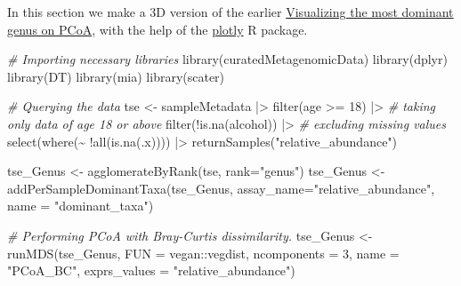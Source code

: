 \documentclass[
]{book}
\newenvironment{Shaded}{\begin{snugshade}}{\end{snugshade}}
\newcommand{\AttributeTok}[1]{\textcolor[rgb]{0.77,0.63,0.00}{#1}}
\newcommand{\CommentTok}[1]{\textcolor[rgb]{0.56,0.35,0.01}{\textit{#1}}}
\newcommand{\DecValTok}[1]{\textcolor[rgb]{0.00,0.00,0.81}{#1}}
\newcommand{\FunctionTok}[1]{\textcolor[rgb]{0.00,0.00,0.00}{#1}}
\newcommand{\NormalTok}[1]{#1}
\newcommand{\OtherTok}[1]{\textcolor[rgb]{0.56,0.35,0.01}{#1}}
\newcommand{\SpecialCharTok}[1]{\textcolor[rgb]{0.00,0.00,0.00}{#1}}
\newcommand{\StringTok}[1]{\textcolor[rgb]{0.31,0.60,0.02}{#1}}
\begin{document}
\begin{Shaded}
\end{Shaded}

In this section we make a 3D version of the earlier \href{https://microbiome.github.io/OMA/microbiome-exploration.html\#visualizing-the-most-dominant-genus-on-pcoa}{Visualizing the most dominant genus on PCoA}, with the help of the \href{https://plotly.com/r/}{plotly} R package.

\begin{Shaded}
\begin{Highlighting}[]
\CommentTok{\# Importing necessary libraries}
\FunctionTok{library}\NormalTok{(curatedMetagenomicData)}
\FunctionTok{library}\NormalTok{(dplyr)}
\FunctionTok{library}\NormalTok{(DT)}
\FunctionTok{library}\NormalTok{(mia)}
\FunctionTok{library}\NormalTok{(scater)}

\CommentTok{\# Querying the data}
\NormalTok{tse }\OtherTok{\textless{}{-}}\NormalTok{ sampleMetadata }\SpecialCharTok{|\textgreater{}}
    \FunctionTok{filter}\NormalTok{(age }\SpecialCharTok{\textgreater{}=} \DecValTok{18}\NormalTok{) }\SpecialCharTok{|\textgreater{}} \CommentTok{\# taking only data of age 18 or above}
    \FunctionTok{filter}\NormalTok{(}\SpecialCharTok{!}\FunctionTok{is.na}\NormalTok{(alcohol)) }\SpecialCharTok{|\textgreater{}} \CommentTok{\# excluding missing values}
    \FunctionTok{select}\NormalTok{(}\FunctionTok{where}\NormalTok{(}\SpecialCharTok{\textasciitilde{}} \SpecialCharTok{!}\FunctionTok{all}\NormalTok{(}\FunctionTok{is.na}\NormalTok{(.x)))) }\SpecialCharTok{|\textgreater{}}
    \FunctionTok{returnSamples}\NormalTok{(}\StringTok{"relative\_abundance"}\NormalTok{)}

\NormalTok{tse\_Genus }\OtherTok{\textless{}{-}} \FunctionTok{agglomerateByRank}\NormalTok{(tse, }\AttributeTok{rank=}\StringTok{"genus"}\NormalTok{)}
\NormalTok{tse\_Genus }\OtherTok{\textless{}{-}} \FunctionTok{addPerSampleDominantTaxa}\NormalTok{(tse\_Genus, }\AttributeTok{assay\_name=}\StringTok{"relative\_abundance"}\NormalTok{, }\AttributeTok{name =} \StringTok{"dominant\_taxa"}\NormalTok{)}

\CommentTok{\# Performing PCoA with Bray{-}Curtis dissimilarity.}
\NormalTok{tse\_Genus }\OtherTok{\textless{}{-}} \FunctionTok{runMDS}\NormalTok{(tse\_Genus, }\AttributeTok{FUN =}\NormalTok{ vegan}\SpecialCharTok{::}\NormalTok{vegdist, }\AttributeTok{ncomponents =} \DecValTok{3}\NormalTok{,}
              \AttributeTok{name =} \StringTok{"PCoA\_BC"}\NormalTok{, }\AttributeTok{exprs\_values =} \StringTok{"relative\_abundance"}\NormalTok{)}


\end{Highlighting}
\end{Shaded}
\end{document}
